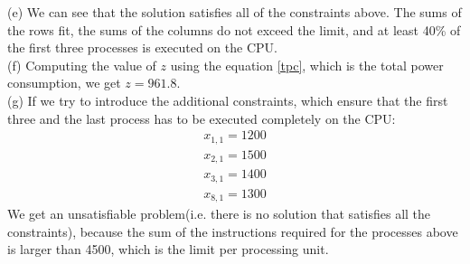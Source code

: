 \documentclass{article}
\begin{document}
(e) We can see that the solution satisfies all of the constraints above. The sums of the rows fit, the sums of the columns do not exceed the limit, and at least 40\% of the first three processes is executed on the CPU.\\

(f) Computing the value of $z$ using the equation \eqref{tpc}, which is the total power consumption, we get $z = 961.8$.\\

(g) If we try to introduce the additional constraints, which ensure that the first three and the last process has to be executed completely on the CPU:
\begin{equation*}
    \begin{split}
    x_{1, 1} = 1200\\
    x_{2, 1} = 1500\\
    x_{3, 1} = 1400\\
    x_{8, 1} = 1300
    \end{split}
\end{equation*}
We get an unsatisfiable problem(i.e. there is no solution that satisfies all the constraints), because the sum of the instructions required for the processes above is larger than 4500, which is the limit per processing unit.
\end{document}
